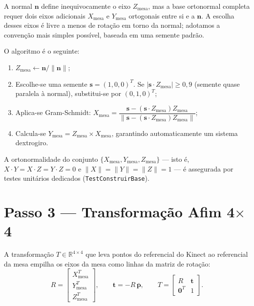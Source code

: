 A normal $\mathbf{n}$ define inequivocamente o eixo $Z_{\text{mesa}}$,
mas a base ortonormal completa requer dois eixos adicionais $X_{\text{mesa}}$
e $Y_{\text{mesa}}$ ortogonais entre si e a $\mathbf{n}$. A escolha
desses eixos é livre a menos de rotação em torno da normal; adotamos a
convenção mais simples possível, baseada em uma semente padrão.

O algoritmo é o seguinte:

\begin{enumerate}
    \item $Z_{\text{mesa}} \leftarrow \mathbf{n} / \|\mathbf{n}\|$;
    \item Escolhe-se uma semente $\mathbf{s} = (1, 0, 0)^{T}$. Se
          $|\mathbf{s} \cdot Z_{\text{mesa}}| \geq 0{,}9$ (semente
          quase paralela à normal), substitui-se por $(0, 1, 0)^{T}$;
    \item Aplica-se Gram-Schmidt:
          $X_{\text{mesa}} = \dfrac{\mathbf{s} - (\mathbf{s} \cdot Z_{\text{mesa}}) Z_{\text{mesa}}}{\| \mathbf{s} - (\mathbf{s} \cdot Z_{\text{mesa}}) Z_{\text{mesa}} \|}$;
    \item Calcula-se $Y_{\text{mesa}} = Z_{\text{mesa}} \times
          X_{\text{mesa}}$, garantindo automaticamente um sistema
          dextrogiro.
\end{enumerate}

A ortonormalidade do conjunto $\{X_{\text{mesa}}, Y_{\text{mesa}},
Z_{\text{mesa}}\}$ — isto é, $X \cdot Y = X \cdot Z = Y \cdot Z = 0$ e
$\|X\| = \|Y\| = \|Z\| = 1$ — é assegurada por testes unitários
dedicados (\texttt{TestConstruirBase}).

\section{Passo 3 — Transformação Afim 4$\times$4}
\label{sec:passo3}

A transformação $T \in \mathbb{R}^{4 \times 4}$ que leva pontos do
referencial do Kinect ao referencial da mesa empilha os eixos da mesa
como linhas da matriz de rotação:
\begin{equation}
R = \begin{bmatrix}
X_{\text{mesa}}^{T} \\
Y_{\text{mesa}}^{T} \\
Z_{\text{mesa}}^{T}
\end{bmatrix},
\qquad
\mathbf{t} = -R \, \bar{\mathbf{p}},
\qquad
T = \begin{bmatrix} R & \mathbf{t} \\ \mathbf{0}^{T} & 1 \end{bmatrix}.
\end{equation}

